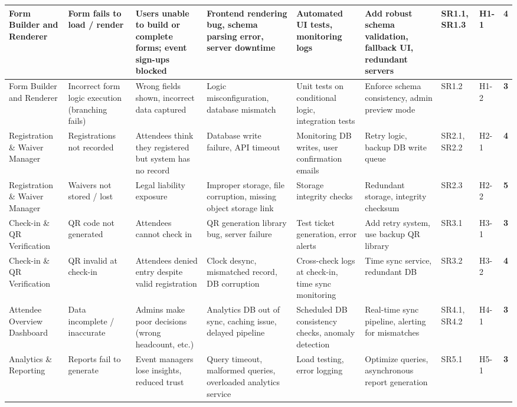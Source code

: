 \documentclass[12pt]{article}
\begin{document}
\begin{longtable}{|L{2.0cm}|L{1.8cm}|L{1.9cm}|L{1.9cm}|L{1.8cm}|L{2.4cm}|L{0.9cm}|L{1.1cm}|L{1cm}|}
Form Builder and Renderer & Form fails to load / render & Users unable to build or complete forms; event sign-ups blocked & Frontend rendering bug, schema parsing error, server downtime & Automated UI tests, monitoring logs & Add robust schema validation, fallback UI, redundant servers & SR1.1, SR1.3 & H1-1 & \textbf{4} \\
\hline
Form Builder and Renderer & Incorrect form logic execution (branching fails) & Wrong fields shown, incorrect data captured & Logic misconfiguration, database mismatch & Unit tests on conditional logic, integration tests & Enforce schema consistency, admin preview mode & SR1.2 & H1-2 & \textbf{3} \\
\hline
Registration \& Waiver Manager & Registrations not recorded & Attendees think they registered but system has no record & Database write failure, API timeout & Monitoring DB writes, user confirmation emails & Retry logic, backup DB write queue & SR2.1, SR2.2 & H2-1 & \textbf{4} \\
\hline
Registration \& Waiver Manager & Waivers not stored / lost & Legal liability exposure & Improper storage, file corruption, missing object storage link & Storage integrity checks & Redundant storage, integrity checksum & SR2.3 & H2-2 & \textbf{5} \\
\hline
Check-in \& QR Verification & QR code not generated & Attendees cannot check in & QR generation library bug, server failure & Test ticket generation, error alerts & Add retry system, use backup QR library & SR3.1 & H3-1 & \textbf{3} \\
\hline
Check-in \& QR Verification & QR invalid at check-in & Attendees denied entry despite valid registration & Clock desync, mismatched record, DB corruption & Cross-check logs at check-in, time sync monitoring & Time sync service, redundant DB & SR3.2 & H3-2 & \textbf{4} \\
\hline
Attendee Overview Dashboard & Data incomplete / inaccurate & Admins make poor decisions (wrong headcount, etc.) & Analytics DB out of sync, caching issue, delayed pipeline & Scheduled DB consistency checks, anomaly detection & Real-time sync pipeline, alerting for mismatches & SR4.1, SR4.2 & H4-1 & \textbf{3} \\
\hline
Analytics \& Reporting & Reports fail to generate & Event managers lose insights, reduced trust & Query timeout, malformed queries, overloaded analytics service & Load testing, error logging & Optimize queries, asynchronous report generation & SR5.1 & H5-1 & \textbf{3} \\

\end{longtable}
\end{document}
